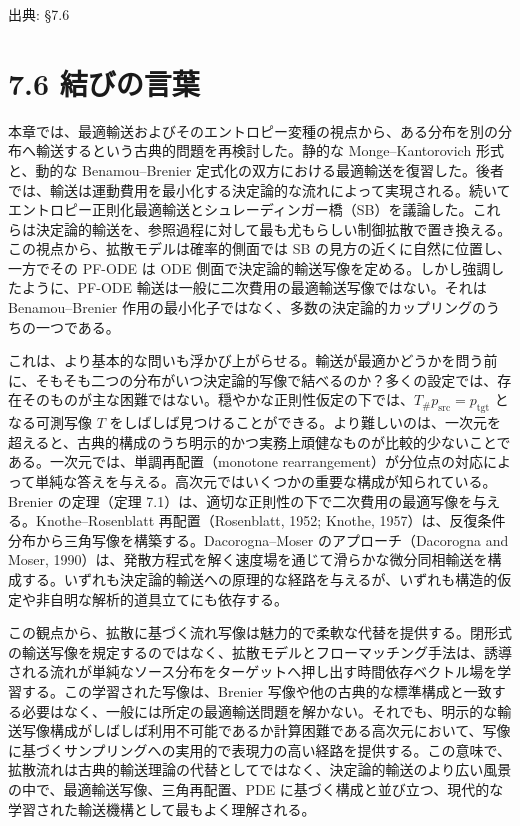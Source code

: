 

{\color{gray}\footnotesize 出典: §7.6\par}
\vspace{0.2em}

\section*{7.6 結びの言葉}


本章では、最適輸送およびそのエントロピー変種の視点から、ある分布を別の分布へ輸送するという古典的問題を再検討した。静的な Monge–Kantorovich 形式と、動的な Benamou–Brenier 定式化の双方における最適輸送を復習した。後者では、輸送は運動費用を最小化する決定論的な流れによって実現される。続いてエントロピー正則化最適輸送とシュレーディンガー橋（SB）を議論した。これらは決定論的輸送を、参照過程に対して最も尤もらしい制御拡散で置き換える。この視点から、拡散モデルは確率的側面では SB の見方の近くに自然に位置し、一方でその PF-ODE は ODE 側面で決定論的輸送写像を定める。しかし強調したように、PF-ODE 輸送は一般に二次費用の最適輸送写像ではない。それは Benamou–Brenier 作用の最小化子ではなく、多数の決定論的カップリングのうちの一つである。

これは、より基本的な問いも浮かび上がらせる。輸送が最適かどうかを問う前に、そもそも二つの分布がいつ決定論的写像で結べるのか？多くの設定では、存在そのものが主な困難ではない。穏やかな正則性仮定の下では、$T_{\#}p_{\mathrm{src}}=p_{\mathrm{tgt}}$ となる可測写像 $T$ をしばしば見つけることができる。より難しいのは、一次元を超えると、古典的構成のうち明示的かつ実務上頑健なものが比較的少ないことである。一次元では、単調再配置（monotone rearrangement）が分位点の対応によって単純な答えを与える。高次元ではいくつかの重要な構成が知られている。Brenier の定理（定理 7.1）は、適切な正則性の下で二次費用の最適写像を与える。Knothe–Rosenblatt 再配置（Rosenblatt, 1952; Knothe, 1957）は、反復条件分布から三角写像を構築する。Dacorogna–Moser のアプローチ（Dacorogna and Moser, 1990）は、発散方程式を解く速度場を通じて滑らかな微分同相輸送を構成する。いずれも決定論的輸送への原理的な経路を与えるが、いずれも構造的仮定や非自明な解析的道具立てにも依存する。

この観点から、拡散に基づく流れ写像は魅力的で柔軟な代替を提供する。閉形式の輸送写像を規定するのではなく、拡散モデルとフローマッチング手法は、誘導される流れが単純なソース分布をターゲットへ押し出す時間依存ベクトル場を学習する。この学習された写像は、Brenier 写像や他の古典的な標準構成と一致する必要はなく、一般には所定の最適輸送問題を解かない。それでも、明示的な輸送写像構成がしばしば利用不可能であるか計算困難である高次元において、写像に基づくサンプリングへの実用的で表現力の高い経路を提供する。この意味で、拡散流れは古典的輸送理論の代替としてではなく、決定論的輸送のより広い風景の中で、最適輸送写像、三角再配置、PDE に基づく構成と並び立つ、現代的な学習された輸送機構として最もよく理解される。

